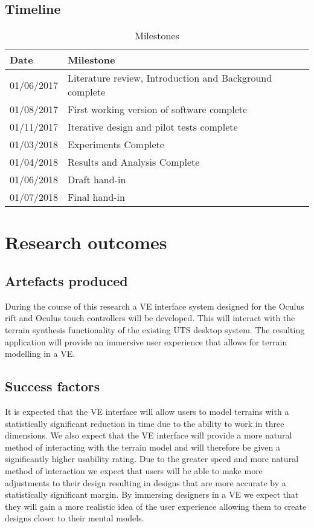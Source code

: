 \documentclass{sig-alternate-05-2015}
\begin{document}
\subsection{Timeline}
\begin{table}[H]
	\centering
	\begin{tabular}{m{2cm} |m{4cm}}
		Date & Milestone\\ \hline
		01/06/2017 & Literature review, Introduction and Background complete\\
		01/08/2017 & First working version of software complete\\
		01/11/2017 & Iterative design and pilot tests complete \\
		01/03/2018 & Experiments Complete\\
		01/04/2018 & Results and Analysis Complete\\
		01/06/2018 & Draft hand-in\\
		01/07/2018 & Final hand-in		
	\end{tabular}
\caption{Milestones}
\end{table}
\section{Research outcomes}
\subsection{Artefacts produced}
During the course of this research a VE interface system designed for the Oculus rift and Oculus touch controllers will be developed. This will interact with the terrain synthesis functionality of the existing UTS desktop system\cite{Gain2015}. The resulting application will provide an immersive user experience that allows for terrain modelling in a VE.
\subsection{Success factors}
It is expected that the VE interface will allow users to model terrains with a statistically significant reduction in time due to the ability to work in three dimensions. We also expect that the VE interface will provide a more natural method of interacting with the terrain model and will therefore be given a significantly higher usability rating. Due to the greater speed and more natural method of interaction we expect that users will be able to make more adjustments to their design resulting in designs that are more accurate by a statistically significant margin. By immersing designers in a VE we expect that they will gain a more realistic idea of the user experience allowing them to create designs closer to their mental models.
\end{document}

